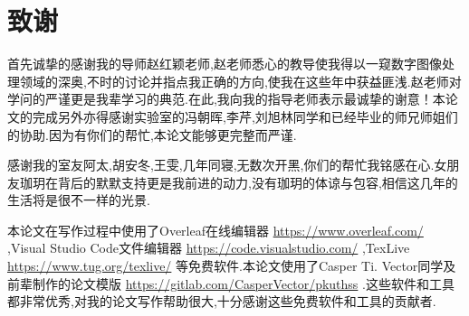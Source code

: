 \chapter{致谢}
首先诚挚的感谢我的导师赵红颖老师,赵老师悉心的教导使我得以一窥数字图像处理领域的深奥,不时的讨论并指点我正确的方向,使我在这些年中获益匪浅.赵老师对学问的严谨更是我辈学习的典范.在此,我向我的指导老师表示最诚挚的谢意！本论文的完成另外亦得感谢实验室的冯朝晖,李芹,刘旭林同学和已经毕业的师兄师姐们的协助.因为有你们的帮忙,本论文能够更完整而严谨.
\par
感谢我的室友阿太,胡安冬,王雯,几年同寝,无数次开黑,你们的帮忙我铭感在心.女朋友珈玥在背后的默默支持更是我前进的动力,没有珈玥的体谅与包容,相信这几年的生活将是很不一样的光景.
\par
本论文在写作过程中使用了Overleaf在线编辑器 \url{https://www.overleaf.com/} ,Visual Studio Code文件编辑器 \url{https://code.visualstudio.com/} ,TexLive \url{https://www.tug.org/texlive/} 等免费软件.本论文使用了Casper Ti. Vector同学及前辈制作的论文模版 \url{https://gitlab.com/CasperVector/pkuthss} .这些软件和工具都非常优秀,对我的论文写作帮助很大,十分感谢这些免费软件和工具的贡献者.

